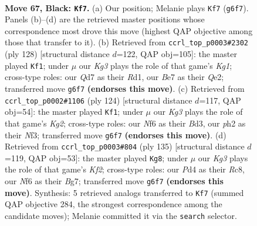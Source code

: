 \documentclass[11pt]{article}
\begin{document}
\clearpage

\begin{figure}[p]\centering
\begin{subfigure}{0.46\textwidth}\centering
\resizebox{\linewidth}{!}{%
\newchessgame
\chessboard[
  setfen={5r2/3qb3/5nk1/P1p2p1p/3p1Pp1/3Q4/1R1BPK1P/3N4 b - - 10 67},
  showmover=false,
  pgfstyle=straightmove, color=movearrow, markmove={g6-f7}
]}
\caption{}
\end{subfigure}\hfill
\begin{subfigure}{0.46\textwidth}\centering
\resizebox{\linewidth}{!}{%
\newchessgame
\chessboard[
  setfen={8/1p3k2/5p1p/3q1bpP/1p1P4/1Pr2P2/P3Q1P1/3RN1K1 w - - 7 65},
  showmover=false,
  pgfstyle=straightmove, color=movearrow, markmove={g1-f1}
]}
\caption{}
\end{subfigure}
\\[4pt]
\begin{subfigure}{0.46\textwidth}\centering
\resizebox{\linewidth}{!}{%
\newchessgame
\chessboard[
  setfen={8/5pk1/2q1nbp1/2Pp3p/7P/3BPNP1/2Q2PK1/8 w - - 1 63},
  showmover=false,
  pgfstyle=straightmove, color=movearrow, markmove={g2-f1}
]}
\caption{}
\end{subfigure}\hfill
\begin{subfigure}{0.46\textwidth}\centering
\resizebox{\linewidth}{!}{%
\newchessgame
\chessboard[
  setfen={2r1q3/5kb1/5pp1/3Pp3/2p1P1QP/1p3R2/1n1B2PK/1B6 b - - 0 68},
  showmover=false,
  pgfstyle=straightmove, color=movearrow, markmove={f7-g8}
]}
\caption{}
\end{subfigure}
\caption{\textbf{Move 67, Black: \texttt{Kf7}.} (a) Our position; Melanie plays \texttt{Kf7} (\texttt{g6f7}). Panels (b)--(d) are the retrieved master positions whose correspondence most drove this move (highest QAP objective among those that transfer to it). (b) Retrieved from \texttt{ccrl\_top\_p0003\#2302} (ply 128) [structural distance $d$=122, QAP obj=105]: the master played \texttt{Kf1}; under $\mu$ our \emph{Kg3} plays the role of that game's \emph{Kg1}; cross-type roles: our \emph{Q}d7 as their \emph{R}d1, our \emph{B}e7 as their \emph{Q}e2; transferred move \texttt{g6f7} \textbf{(endorses this move)}. (c) Retrieved from \texttt{ccrl\_top\_p0002\#1106} (ply 124) [structural distance $d$=117, QAP obj=54]: the master played \texttt{Kf1}; under $\mu$ our \emph{Kg3} plays the role of that game's \emph{Kg2}; cross-type roles: our \emph{N}f6 as their \emph{B}d3, our \emph{p}h2 as their \emph{N}f3; transferred move \texttt{g6f7} \textbf{(endorses this move)}. (d) Retrieved from \texttt{ccrl\_top\_p0003\#804} (ply 135) [structural distance $d$=119, QAP obj=53]: the master played \texttt{Kg8}; under $\mu$ our \emph{Kg3} plays the role of that game's \emph{Kf2}; cross-type roles: our \emph{P}d4 as their \emph{R}c8, our \emph{N}f6 as their \emph{B}g7; transferred move \texttt{g6f7} \textbf{(endorses this move)}. Synthesis: 5 retrieved analogs transferred to \texttt{Kf7} (summed QAP objective 284, the strongest correspondence among the candidate moves); Melanie committed it via the \texttt{search} selector.}
\label{fig:thought-m133}
\end{figure}
\end{document}
